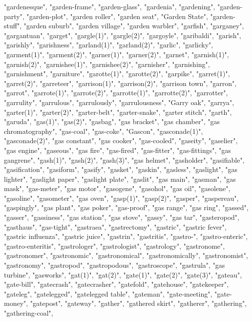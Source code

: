 "gardenesque",
"garden-frame",
"garden-glass",
"gardenia",
"gardening",
"garden-party",
"garden-plot",
"garden roller",
"garden seat",
"Garden State",
"garden-stuff",
"garden suburb",
"garden village",
"garden warbler",
"garfish",
"garganey",
"gargantuan",
"garget",
"gargle(1)",
"gargle(2)",
"gargoyle",
"garibaldi",
"garish",
"garishly",
"garishness",
"garland(1)",
"garland(2)",
"garlic",
"garlicky",
"garment(1)",
"garment(2)",
"garner(1)",
"garner(2)",
"garnet",
"garnish(1)",
"garnish(2)",
"garnishee(1)",
"garnishee(2)",
"garnisher",
"garnishing",
"garnishment",
"garniture",
"garotte(1)",
"garotte(2)",
"garpike",
"garret(1)",
"garret(2)",
"garreteer",
"garrison(1)",
"garrison(2)",
"garrison town",
"garron",
"garrot",
"garrote(1)",
"garrote(2)",
"garrotte(1)",
"garrotte(2)",
"garrotter",
"garrulity",
"garrulous",
"garrulously",
"garrulousness",
"Garry oak",
"garrya",
"garter(1)",
"garter(2)",
"garter-belt",
"garter-snake",
"garter stitch",
"garth",
"garuda",
"gas(1)",
"gas(2)",
"gasbag",
"gas bracket",
"gas chamber",
"gas chromatography",
"gas-coal",
"gas-coke",
"Gascon",
"gasconade(1)",
"gasconade(2)",
"gas constant",
"gas cooker",
"gas-cooled",
"gaseity",
"gaselier",
"gas engine",
"gaseous",
"gas fire",
"gas-fired",
"gas-fitter",
"gas-fittings",
"gas gangrene",
"gash(1)",
"gash(2)",
"gash(3)",
"gas helmet",
"gasholder",
"gasifiable",
"gasification",
"gasiform",
"gasify",
"gasket",
"gaskin",
"gasless",
"gaslight",
"gas lighter",
"gaslight paper",
"gaslight plate",
"gaslit",
"gas main",
"gasman",
"gas mask",
"gas-meter",
"gas motor",
"gasogene",
"gasohol",
"gas oil",
"gasolene",
"gasoline",
"gasometer",
"gas oven",
"gasp(1)",
"gasp(2)",
"gasper",
"gaspereau",
"gaspingly",
"gas plant",
"gas poker",
"gas-proof",
"gas range",
"gas ring",
"gassed",
"gasser",
"gassiness",
"gas station",
"gas stove",
"gassy",
"gas tar",
"gasteropod",
"gasthaus",
"gas-tight",
"gastraea",
"gastrectomy",
"gastric",
"gastric fever",
"gastric influenza",
"gastric juice",
"gastrin",
"gastritis",
"gastro-",
"gastro-enteric",
"gastro-enteritis",
"gastrologer",
"gastrologist",
"gastrology",
"gastronome",
"gastronomer",
"gastronomic",
"gastronomical",
"gastronomically",
"gastronomist",
"gastronomy",
"gastropod",
"gastropodous",
"gastroscope",
"gastrula",
"gas turbine",
"gasworks",
"gat(1)",
"gat(2)",
"gate(1)",
"gate(2)",
"gate(3)",
"gateau",
"gate-bill",
"gatecrash",
"gatecrasher",
"gatefold",
"gatehouse",
"gatekeeper",
"gateleg",
"gatelegged",
"gatelegged table",
"gateman",
"gate-meeting",
"gate-money",
"gatepost",
"gateway",
"gather",
"gathered skirt",
"gatherer",
"gathering",
"gathering-coal",
